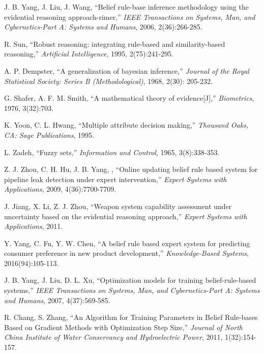\documentclass{ieeeaccess}
\begin{document}
\begin{thebibliography}{00}

     J. B. Yang, J. Liu, J. Wang, ``Belief rule-base inference methodology
    using the evidential reasoning approach-rimer,''
    \emph{IEEE Transactions on Systems, Man, and Cybernetics-Part A: Systems and Humans},
    2006, 2(36):266-285.

     R. Sun, ``Robust reasoning: integrating rule-based and similarity-based
    reasoning,'' \emph{Artificial Intelligence},
    1995, 2(75):241-295.

      A. P. Dempster, ``A generalization of bayesian inference,''
    \emph{Journal of the Royal Statistical Society: Series B (Methodological)},
    1968, 2(30): 205-232.

     G. Shafer, A. F. M. Smith, ``A mathematical theory of evidence[J],''
    \emph{Biometrics},
    1976, 3(32):703.

     K. Yoon, C. L. Hwang, ``Multiple attribute decision making,''
    \emph{Thousand Oaks, CA: Sage Publications},
    1995.

     L. Zadeh, ``Fuzzy sets,''
    \emph{Information and Control},
    1965, 3(8):338-353.

     Z. J. Zhou, C. H. Hu, J. B. Yang, , ``Online updating belief rule based
    system for pipeline leak detection under expert intervention,''
    \emph{Expert Systems with Applications},
    2009, 4(36):7700-7709.

     J. Jiang, X. Li, Z. J. Zhou, ``Weapon system capability assessment
    under uncertainty based on the evidential reasoning approach,''
    \emph{Expert Systems with Applications},
    2011.

     Y. Yang, C. Fu, Y. W. Chen, ``A belief rule based expert system
    for predicting consumer preference in new product development,''
    \emph{Knowledge-Based Systems},
    2016(94):105-113.

     J. B. Yang, J. Liu, D. L. Xu, ``Optimization models for training
    belief-rule-based systems,''
    \emph{IEEE Transactions on Systems, Man, and Cybernetics-Part A: Systems and Humans},
    2007, 4(37):569-585.

     R. Chang, S. Zhang, ``An Algorithm for Training Parameters in Belief Rule-bases Based on
    Gradient Methods with Optimization Step Size,''
    \emph{Journal of North China Institute of Water Conservancy and Hydroelectric Power},
    2011, 1(32):154-157.


\end{thebibliography}
\end{document}
